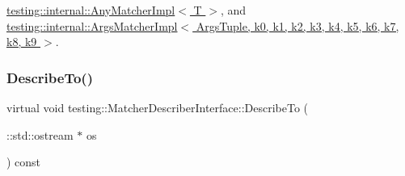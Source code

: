 \hyperlink{classtesting_1_1internal_1_1_any_matcher_impl_ac6570e881174ba774b8d56abaa4f7d25}{testing\+::internal\+::\+Any\+Matcher\+Impl$<$ T $>$}, and \hyperlink{classtesting_1_1internal_1_1_args_matcher_impl_ac8ff5369879836567cedb5434bcca5b9}{testing\+::internal\+::\+Args\+Matcher\+Impl$<$ Args\+Tuple, k0, k1, k2, k3, k4, k5, k6, k7, k8, k9 $>$}.

\mbox{\label{classtesting_1_1_matcher_describer_interface_ad9f861588bd969b6e3e717f13bb94e7b}} 
\subsubsection{\texorpdfstring{Describe\+To()}{DescribeTo()}}
{\footnotesize\ttfamily virtual void testing\+::\+Matcher\+Describer\+Interface\+::\+Describe\+To (\begin{DoxyParamCaption}\item[{\+::std\+::ostream $\ast$}]{os }\end{DoxyParamCaption}) const\hspace{0.3cm}{\ttfamily [pure virtual]}}



